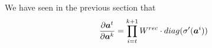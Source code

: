 We have seen in the previous section that
\begin{equation}
\frac{\partial \boldsymbol{a}^t}{\partial \boldsymbol{a}^k} = \prod_{i=t}^{k+1} W^{rec} \cdot diag(\sigma'(\boldsymbol{a}^i))
\end{equation}
